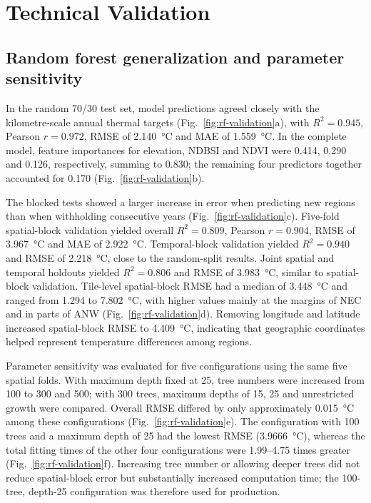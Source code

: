 \section{Technical Validation}

\subsection{Random forest generalization and parameter sensitivity}

In the random 70/30 test set, model predictions agreed closely with the kilometre-scale annual thermal targets (Fig.~\ref*{fig:rf-validation}a), with $R^2=0.945$, Pearson $r=0.972$, RMSE of 2.140~°C and MAE of 1.559~°C. In the complete model, feature importances for elevation, NDBSI and NDVI were 0.414, 0.290 and 0.126, respectively, summing to 0.830; the remaining four predictors together accounted for 0.170 (Fig.~\ref*{fig:rf-validation}b).

The blocked tests showed a larger increase in error when predicting new regions than when withholding consecutive years (Fig.~\ref*{fig:rf-validation}c). Five-fold spatial-block validation yielded overall $R^2=0.809$, Pearson $r=0.904$, RMSE of 3.967~°C and MAE of 2.922~°C. Temporal-block validation yielded $R^2=0.940$ and RMSE of 2.218~°C, close to the random-split results. Joint spatial and temporal holdouts yielded $R^2=0.806$ and RMSE of 3.983~°C, similar to spatial-block validation. Tile-level spatial-block RMSE had a median of 3.448~°C and ranged from 1.294 to 7.802~°C, with higher values mainly at the margins of NEC and in parts of ANW (Fig.~\ref*{fig:rf-validation}d). Removing longitude and latitude increased spatial-block RMSE to 4.409~°C, indicating that geographic coordinates helped represent temperature differences among regions.

Parameter sensitivity was evaluated for five configurations using the same five spatial folds. With maximum depth fixed at 25, tree numbers were increased from 100 to 300 and 500; with 300 trees, maximum depths of 15, 25 and unrestricted growth were compared. Overall RMSE differed by only approximately 0.015~°C among these configurations (Fig.~\ref*{fig:rf-validation}e). The configuration with 100 trees and a maximum depth of 25 had the lowest RMSE (3.9666~°C), whereas the total fitting times of the other four configurations were 1.99--4.75 times greater (Fig.~\ref*{fig:rf-validation}f). Increasing tree number or allowing deeper trees did not reduce spatial-block error but substantially increased computation time; the 100-tree, depth-25 configuration was therefore used for production.

